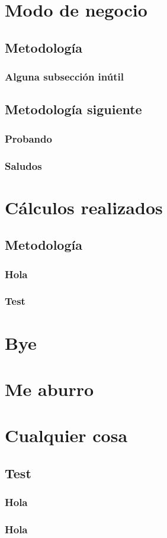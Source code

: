 \begin{anexo}
	\section{Modo de negocio}
		\subsection{Metodología}
			\subsubsection{Alguna subsección inútil}
		\subsection{Metodología siguiente}
			\subsubsection{Probando}
			\subsubsection{Saludos}
	\section{Cálculos realizados}
		\subsection{Metodología}
			\lipsum[1]
			\subsubsection{Hola}
			\subsubsection{Test}
	\section{Bye}
	\section{Me aburro}
\end{anexo}

\section{Cualquier cosa}
	\subsection{Test}
		\subsubsection{Hola}
		\subsubsection{Hola}